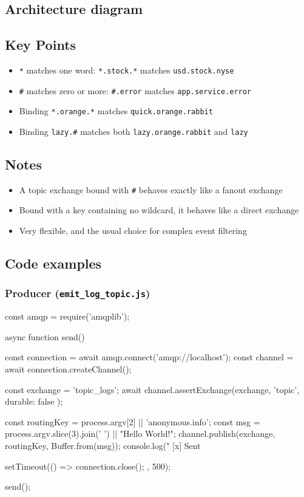 \documentclass[11pt,a4paper]{article}
\begin{document}
\subsection{Architecture diagram}

\subsection*{Key Points}

\begin{itemize}\itemsep2pt
  \item \lstinline|*| matches one word: \lstinline|*.stock.*| matches \lstinline|usd.stock.nyse|
  \item \lstinline|#| matches zero or more: \lstinline|#.error| matches \lstinline|app.service.error|
  \item Binding \lstinline|*.orange.*| matches \lstinline|quick.orange.rabbit|
  \item Binding \lstinline|lazy.#| matches both \lstinline|lazy.orange.rabbit| and \lstinline|lazy|
\end{itemize}

\subsection*{Notes}

\begin{itemize}\itemsep2pt
  \item A topic exchange bound with \lstinline|#| behaves exactly like a fanout exchange
  \item Bound with a key containing no wildcard, it behaves like a direct exchange
  \item Very flexible, and the usual choice for complex event filtering
\end{itemize}

\newpage
\subsection{Code examples}

\subsubsection*{Producer (\texttt{emit\_log\_topic.js})}
\begin{js}
const amqp = require('amqplib');

async function send() {
    const connection = await amqp.connect('amqp://localhost');
    const channel = await connection.createChannel();

    const exchange = 'topic_logs';
    await channel.assertExchange(exchange, 'topic', { durable: false });

    const routingKey = process.argv[2] || 'anonymous.info';
    const msg = process.argv.slice(3).join(' ') || "Hello World!";
    channel.publish(exchange, routingKey, Buffer.from(msg));
    console.log(" [x] Sent %

    setTimeout(() => { connection.close(); }, 500);
}
send();
\end{js}
\end{document}
